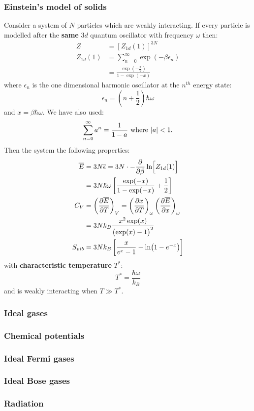 \documentclass{article}
\begin{document}
\begin{multicols*}{3}
\subsubsection*{Einstein's model of solids}
Consider a system of $N$ particles which are weakly interacting.
If every particle is modelled after the \textbf{same}
$3d$ quantum oscillator with frequency $\omega$ then:
\begin{align*}
    Z &= [Z_{1d}(1)]^{3N} \\
    Z_{1d}(1) 
    &=\sum_{n=0}^{\infty}\exp(-\beta\epsilon_n) \\
    &=\frac{\exp(-\frac{x}{2})}{1-\exp(-x)}
\end{align*}
where $\epsilon_n$ is the one dimensional harmonic oscillator
at the $n^{th}$ energy state:
$$\epsilon_n=\left(n+\frac{1}{2}\right)\hbar\omega$$
and $x=\beta\hbar\omega$. We have also used:
$$\sum_{n=0}^{\infty}a^n=\frac{1}{1-a}
\hspace*{0.05in}\text{where}\hspace*{0.05in}|a|<1.$$
Then the system the following properties:
\begin{align*}
    \overline{E} &=3N\overline{\epsilon}
    =3N\cdot-\frac{\partial}{\partial\beta}\ln\Bigl[
    Z_{1d}(1)\Bigr] \\
    &=3N\hbar\omega\left[\frac{\exp(-x)}
    {1-\exp(-x)}+\frac{1}{2}\right] \\
    C_V &=\left(\frac{\partial\overline{E}}{\partial T}\right)_V
    =\left(\frac{\partial x}{\partial T}\right)_{\omega}
    \left(\frac{\partial\overline{E}}{\partial x}\right)_{\omega} \\
    &=3Nk_B\frac{x^2\exp(x)}{\bigl(\exp(x)-1\bigr)^2} \\
    S_{vib} &=3Nk_B\left[\frac{x}{e^x-1}-\ln(1-e^{-x})\right]
\end{align*}
with \textbf{characteristic temperature} $T^*$:
$$T^*=\frac{\hbar\omega}{k_B}$$
and is weakly interacting when $T\gg T^*$.

\subsubsection*{Ideal gases}

\subsubsection*{Chemical potentials}

\subsubsection*{Ideal Fermi gases}

\subsubsection*{Ideal Bose gases}

\subsubsection*{Radiation}

\end{multicols*}
\end{document}
